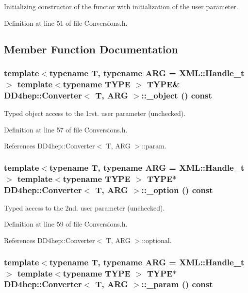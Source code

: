 Initializing constructor of the functor with initialization of the user parameter. 

Definition at line 51 of file Conversions.h.

\subsection{Member Function Documentation}
\hypertarget{struct_d_d4hep_1_1_converter_a34ae0018af9b4cfadb5f7eae07b5b1a5}{
\subsubsection[{\_\-object}]{\setlength{\rightskip}{0pt plus 5cm}template$<$typename T, typename ARG = XML::Handle\_\-t$>$ template$<$typename TYPE $>$ TYPE\& {\bf DD4hep::Converter}$<$ {\bf T}, ARG $>$::\_\-object () const}}
\label{struct_d_d4hep_1_1_converter_a34ae0018af9b4cfadb5f7eae07b5b1a5}


Typed object access to the 1rst. user parameter (unchecked). 

Definition at line 57 of file Conversions.h.

References DD4hep::Converter$<$ T, ARG $>$::param.\hypertarget{struct_d_d4hep_1_1_converter_aebbcb36c52df173c5e3ebcfb3402008d}{
\subsubsection[{\_\-option}]{\setlength{\rightskip}{0pt plus 5cm}template$<$typename T, typename ARG = XML::Handle\_\-t$>$ template$<$typename TYPE $>$ TYPE$\ast$ {\bf DD4hep::Converter}$<$ {\bf T}, ARG $>$::\_\-option () const}}
\label{struct_d_d4hep_1_1_converter_aebbcb36c52df173c5e3ebcfb3402008d}


Typed access to the 2nd. user parameter (unchecked). 

Definition at line 59 of file Conversions.h.

References DD4hep::Converter$<$ T, ARG $>$::optional.\hypertarget{struct_d_d4hep_1_1_converter_af0cc676056c89bd966c084d88828a2b2}{
\subsubsection[{\_\-param}]{\setlength{\rightskip}{0pt plus 5cm}template$<$typename T, typename ARG = XML::Handle\_\-t$>$ template$<$typename TYPE $>$ TYPE$\ast$ {\bf DD4hep::Converter}$<$ {\bf T}, ARG $>$::\_\-param () const}}
\label{struct_d_d4hep_1_1_converter_af0cc676056c89bd966c084d88828a2b2}


